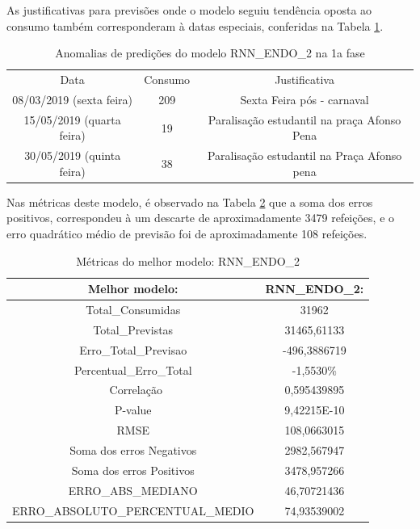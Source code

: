         As justificativas para previsões onde o modelo seguiu tendência oposta ao consumo também corresponderam à datas especiais, conferidas na Tabela \ref{table:rnn_endo_2_red}.
            \begin{table}[!ht]
                \caption{Anomalias de predições do modelo RNN\_ENDO\_2 na 1a fase}
                \label{table:rnn_endo_2_red}
                 \begin{tabular}{c|c|c}
                 \rowcolor{gray!50}
                 \hline
                Data & Consumo & Justificativa \\
                08/03/2019 (sexta feira)   & 209 &Sexta Feira pós - carnaval\\
                15/05/2019 (quarta feira)   & 19  & Paralisação estudantil na praça Afonso Pena\\
                30/05/2019 (quinta feira)   &  38  & Paralisação estudantil na Praça Afonso pena\\
                \hline 
                \end{tabular} 
            \end{table}
        
        Nas métricas deste modelo, é observado na Tabela \ref{table:rnn_endo_2_test} que a soma dos erros positivos, correspondeu à um descarte de aproximadamente 3479 refeições, e o erro quadrático médio de previsão foi de aproximadamente 108 refeições.
            \begin{table}[!ht]
                \centering
                \caption{Métricas do melhor modelo:  RNN\_ENDO\_2 }
                \label{table:rnn_endo_2_test}
                \begin{tabular}{c|c}
                \rowcolor{gray!50}
                \hline
                Melhor modelo: &   RNN\_ENDO\_2: \\ \hline
                Total\_Consumidas & 31962 \\ 
                Total\_Previstas & 31465,61133 \\
                Erro\_Total\_Previsao & -496,3886719 \\
                Percentual\_Erro\_Total & -1,5530\% \\\
                Correlação & 0,595439895 \\
                P-value & 9,42215E-10    \\
                RMSE &  108,0663015\\
                Soma dos erros Negativos & 2982,567947 \\
                Soma dos erros Positivos & 3478,957266\\
                ERRO\_ABS\_MEDIANO & 46,70721436 \\ 
                ERRO\_ABSOLUTO\_PERCENTUAL\_MEDIO & 74,93539002 \\ 
                \hline
                \end{tabular}
            \end{table}
        
